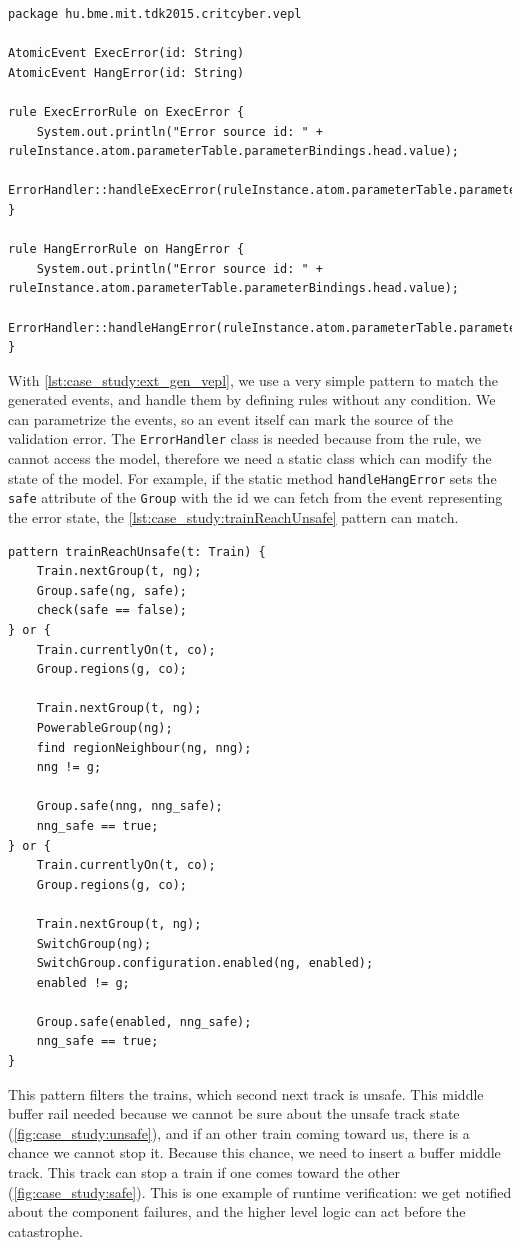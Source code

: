 \begin{lstlisting}[caption={Extended VEPL definition},label=lst:case_study:ext_gen_vepl]
package hu.bme.mit.tdk2015.critcyber.vepl

AtomicEvent ExecError(id: String)
AtomicEvent HangError(id: String)

rule ExecErrorRule on ExecError {
	System.out.println("Error source id: " + ruleInstance.atom.parameterTable.parameterBindings.head.value);
	ErrorHandler::handleExecError(ruleInstance.atom.parameterTable.parameterBindings.head.value)
}

rule HangErrorRule on HangError {
	System.out.println("Error source id: " + ruleInstance.atom.parameterTable.parameterBindings.head.value);
	ErrorHandler::handleHangError(ruleInstance.atom.parameterTable.parameterBindings.head.value)
}
\end{lstlisting}

With \cref{lst:case_study:ext_gen_vepl}, we use a very simple pattern to match the generated events, and handle them by defining rules without any condition. We can parametrize the events, so an event itself can mark the source of the validation error. The \verb+ErrorHandler+ class is needed because from the rule, we cannot access the model, therefore we need a static class which can modify the state of the model. For example, if the static method \verb+handleHangError+ sets the \verb+safe+ attribute of the \verb+Group+ with the id we can fetch from the event representing the error state, the \cref{lst:case_study:trainReachUnsafe} pattern can match.

\newpage
\begin{lstlisting}[caption={Collision detection},label=lst:case_study:trainReachUnsafe]
pattern trainReachUnsafe(t: Train) {
	Train.nextGroup(t, ng);
	Group.safe(ng, safe);
	check(safe == false);
} or {
	Train.currentlyOn(t, co);
	Group.regions(g, co);
	
	Train.nextGroup(t, ng);
	PowerableGroup(ng);
	find regionNeighbour(ng, nng);
	nng != g;
	
	Group.safe(nng, nng_safe);
	nng_safe == true;
} or {
	Train.currentlyOn(t, co);
	Group.regions(g, co);
	
	Train.nextGroup(t, ng);
	SwitchGroup(ng);
	SwitchGroup.configuration.enabled(ng, enabled);
	enabled != g;
	
	Group.safe(enabled, nng_safe);
	nng_safe == true;
}
\end{lstlisting}

This pattern filters the trains, which second next track is unsafe. This middle buffer rail needed because we cannot be sure about the unsafe track state (\cref{fig:case_study:unsafe}), and if an other train coming toward us, there is a chance we cannot stop it. Because this chance, we need to insert a buffer middle track. This track can stop a train if one comes toward the other (\cref{fig:case_study:safe}). This is one example of runtime verification: we get notified about the component failures, and the higher level logic can act before the catastrophe.

